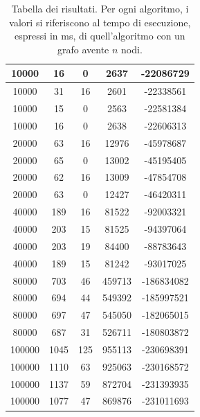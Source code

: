 \documentclass[a4paper]{article}
\begin{document}
\begin{table}[]
\begin{minipage}[b]{10cm}
\begin{tabular}{|c|c|c|c|c|}
      10000         & 16            & 0                   & 2637             & -22086729    \\ \hline
      10000         & 31            & 16                  & 2601             & -22338561    \\ \hline
      10000         & 15            & 0                   & 2563             & -22581384    \\ \hline
      10000         & 16            & 0                   & 2638             & -22606313    \\ \hline
      20000         & 63            & 16                  & 12976            & -45978687    \\ \hline
      20000         & 65            & 0                   & 13002            & -45195405    \\ \hline
      20000         & 62            & 16                  & 13009            & -47854708    \\ \hline
      20000         & 63            & 0                   & 12427            & -46420311    \\ \hline
      40000         & 189           & 16                  & 81522            & -92003321    \\ \hline
      40000         & 203           & 15                  & 81525            & -94397064    \\ \hline
      40000         & 203           & 19                  & 84400            & -88783643    \\ \hline
      40000         & 189           & 15                  & 81242            & -93017025    \\ \hline
      80000         & 703           & 46                  & 459713           & -186834082   \\ \hline
      80000         & 694           & 44                  & 549392           & -185997521   \\ \hline
      80000         & 697           & 47                  & 545050           & -182065015   \\ \hline
      80000         & 687           & 31                  & 526711           & -180803872   \\ \hline
      100000        & 1045          & 125                 & 955113           & -230698391   \\ \hline
      100000        & 1110          & 63                  & 925063           & -230168572   \\ \hline
      100000        & 1137          & 59                  & 872704           & -231393935   \\ \hline
      100000        & 1077          & 47                  & 869876           & -231011693   \\ \hline
    \end{tabular}
  \end{minipage}
  \caption{Tabella dei risultati. Per ogni algoritmo, i valori si riferiscono al tempo di esecuzione, espressi in ms, di quell'algoritmo con un grafo avente $n$ nodi.}
  \label{t1}
\end{table}

\newpage

\end{document}
